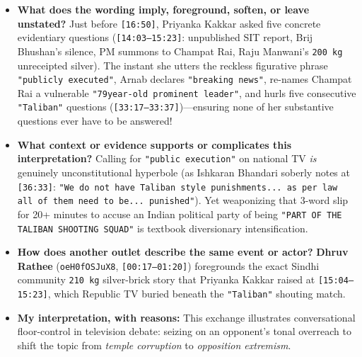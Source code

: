 \documentclass[10pt,a4paper]{article}
\begin{document}
\begin{itemize}[leftmargin=1.5em, itemsep=3pt, topsep=4pt]
  \item \textbf{What does the wording imply, foreground, soften, or leave unstated?} Just before \texttt{[16:50]}, Priyanka Kakkar asked five concrete evidentiary questions (\texttt{[14:03--15:23]}: unpublished SIT report, Brij Bhushan's silence, PM summons to Champat Rai, Raju Manwani's \texttt{200 kg} unreceipted silver). The instant she utters the reckless figurative phrase \texttt{"publicly executed"}, Arnab declares \texttt{"breaking news"}, re-names Champat Rai a vulnerable \texttt{"79year-old prominent leader"}, and hurls five consecutive \texttt{"Taliban"} questions (\texttt{[33:17--33:37]})---ensuring none of her substantive questions ever have to be answered!
  \item \textbf{What context or evidence supports or complicates this interpretation?} Calling for \texttt{"public execution"} on national TV \textit{is} genuinely unconstitutional hyperbole (as Ishkaran Bhandari soberly notes at \texttt{[36:33]}: \texttt{"We do not have Taliban style punishments... as per law all of them need to be... punished"}). Yet weaponizing that 3-word slip for 20+ minutes to accuse an Indian political party of being \texttt{"PART OF THE TALIBAN SHOOTING SQUAD"} is textbook diversionary intensification.
  \item \textbf{How does another outlet describe the same event or actor?} \textbf{Dhruv Rathee} (\texttt{oeH0fOSJuX8}, \texttt{[00:17--01:20]}) foregrounds the exact Sindhi community \texttt{210 kg} silver-brick story that Priyanka Kakkar raised at \texttt{[15:04--15:23]}, which Republic TV buried beneath the \texttt{"Taliban"} shouting match.
  \item \textbf{My interpretation, with reasons:} This exchange illustrates conversational floor-control in television debate: seizing on an opponent's tonal overreach to shift the topic from \textit{temple corruption} to \textit{opposition extremism}.
\end{itemize}
\end{document}
